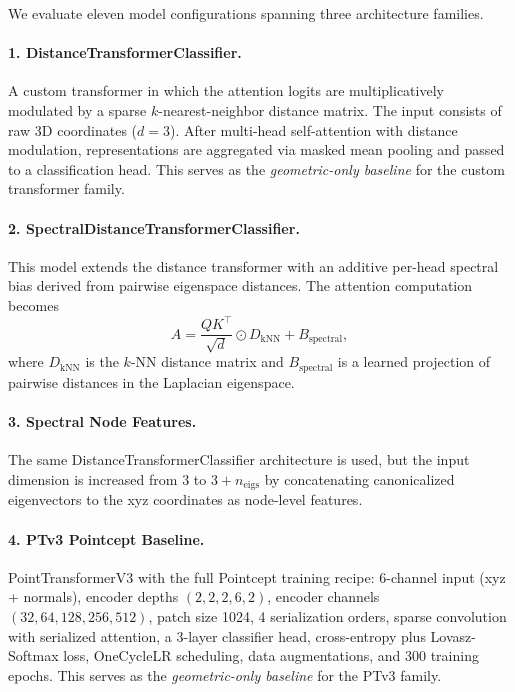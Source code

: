 \documentclass[11pt]{article}
\begin{document}
We evaluate eleven model configurations spanning three architecture families.

\paragraph{1. DistanceTransformerClassifier.}
A custom transformer in which the attention logits are multiplicatively modulated by a sparse
$k$-nearest-neighbor distance matrix. The input consists of raw 3D coordinates ($d=3$). After
multi-head self-attention with distance modulation, representations are aggregated via masked
mean pooling and passed to a classification head. This serves as the \emph{geometric-only
baseline} for the custom transformer family.

\paragraph{2. SpectralDistanceTransformerClassifier.}
This model extends the distance transformer with an additive per-head spectral bias derived
from pairwise eigenspace distances. The attention computation becomes
\[
    A = \frac{QK^\top}{\sqrt{d}} \odot D_{\text{kNN}} + B_{\text{spectral}},
\]
where $D_{\text{kNN}}$ is the $k$-NN distance matrix and $B_{\text{spectral}}$ is a learned
projection of pairwise distances in the Laplacian eigenspace.

\paragraph{3. Spectral Node Features.}
The same DistanceTransformerClassifier architecture is used, but the input dimension is
increased from 3 to $3 + n_{\text{eigs}}$ by concatenating canonicalized eigenvectors to the
xyz coordinates as node-level features.

\paragraph{4. PTv3 Pointcept Baseline.}
PointTransformerV3 with the full Pointcept training recipe: 6-channel input
(xyz + normals), encoder depths $(2, 2, 2, 6, 2)$, encoder channels
$(32, 64, 128, 256, 512)$, patch size 1024, 4 serialization orders, sparse convolution with
serialized attention, a 3-layer classifier head, cross-entropy plus Lovasz-Softmax loss,
OneCycleLR scheduling, data augmentations, and 300 training epochs. This serves as the
\emph{geometric-only baseline} for the PTv3 family.
\end{document}
